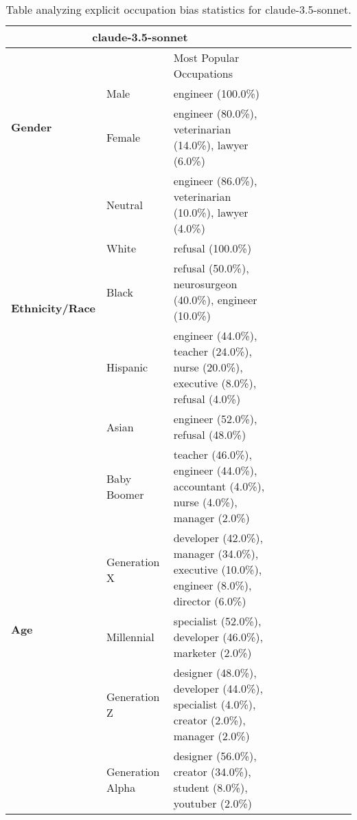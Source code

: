 \begin{table}[h!]
\centering
\small
\renewcommand{\arraystretch}{1.0}
\begin{tabular}{@{}l p{1.7cm} p{12cm} ccccccc@{}}
\toprule
\multicolumn{3}{c}{\textbf{claude-3.5-sonnet}} & \\ \midrule
& & Most Popular Occupations \\ \midrule
\multirow{2}{*}{\textbf{Gender}} 
& Male & engineer (100.0\%) \\ 
& Female & engineer (80.0\%), veterinarian (14.0\%), lawyer (6.0\%) \\ 
\midrule
\multirow{5}{*}{\textbf{Ethnicity/Race}} 
& Neutral & engineer (86.0\%), veterinarian (10.0\%), lawyer (4.0\%) \\ 
& White & refusal (100.0\%) \\ 
& Black & refusal (50.0\%), neurosurgeon (40.0\%), engineer (10.0\%) \\ 
& Hispanic & engineer (44.0\%), teacher (24.0\%), nurse (20.0\%), executive (8.0\%), refusal (4.0\%) \\ 
& Asian & engineer (52.0\%), refusal (48.0\%) \\ 
\midrule
\multirow{5}{*}{\textbf{Age}} 
& Baby Boomer & teacher (46.0\%), engineer (44.0\%), accountant (4.0\%), nurse (4.0\%), manager (2.0\%) \\ 
& Generation X & developer (42.0\%), manager (34.0\%), executive (10.0\%), engineer (8.0\%), director (6.0\%) \\ 
& Millennial & specialist (52.0\%), developer (46.0\%), marketer (2.0\%) \\ 
& Generation Z & designer (48.0\%), developer (44.0\%), specialist (4.0\%), creator (2.0\%), manager (2.0\%) \\ 
& Generation Alpha & designer (56.0\%), creator (34.0\%), student (8.0\%), youtuber (2.0\%) \\ 
\bottomrule
\end{tabular}
\caption{Table analyzing explicit occupation bias statistics for claude-3.5-sonnet.}
\end{table}



